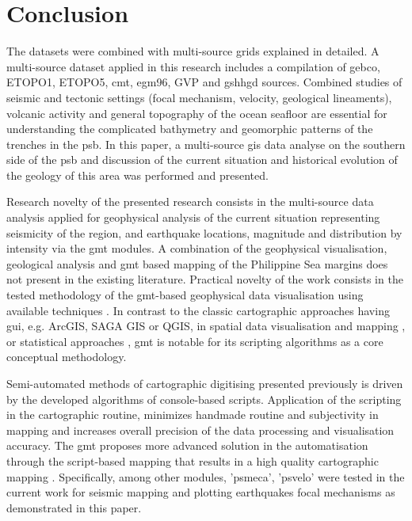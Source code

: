 \documentclass{rrparticle}
\begin{document}
\section{Conclusion}
The datasets were combined with multi-source grids explained in detailed. A multi-source dataset applied in this research includes a compilation of \ac{gebco}, ETOPO1, ETOPO5, \ac{cmt}, \ac{egm96}, GVP and \ac{gshhgd} sources. Combined studies of seismic and tectonic settings (focal mechanism, velocity, geological lineaments), volcanic activity and general topography of the ocean seafloor are essential for understanding the complicated bathymetry and geomorphic patterns of the trenches in the \ac{psb}. In this paper, a multi-source \ac{gis} data analyse on the southern side of the \ac{psb} and discussion of the current situation and historical evolution of the geology of this area was performed and presented. 

Research novelty of the presented research consists in the multi-source data analysis applied for geophysical analysis of the current situation representing seismicity of the region, and earthquake locations, magnitude and distribution by intensity via the \ac{gmt} modules. A combination of the geophysical visualisation, geological analysis and \ac{gmt} based mapping of the Philippine Sea margins does not present in the existing literature. Practical novelty of the work consists in the tested methodology of the \ac{gmt}-based geophysical data visualisation using available techniques \cite{Lemenkova2022a,Lemenkova2022b}. In contrast to the classic cartographic approaches having \ac{gui}, e.g. ArcGIS, SAGA GIS or QGIS, in spatial data visualisation and mapping \cite{Lemenkova2021d,Lemenkova2020e,Klauco2013,Klauco2017,Lemenkova2021b}, or statistical approaches \cite{Lemenkova2019e,Lemenkova2019f}, \ac{gmt} is notable for its scripting algorithms as a core conceptual methodology. 
	
Semi-automated methods of cartographic digitising presented previously \cite{Lemenkova2021b} is driven by the developed algorithms of console-based scripts. Application of the scripting in the cartographic routine, minimizes handmade routine and subjectivity in mapping and increases overall precision of the data processing and visualisation accuracy. The \ac{gmt} proposes more advanced solution in the automatisation through the script-based mapping that results in a high quality cartographic mapping \cite{Lemenkova2020a,Lemenkova2020b,Lemenkova2020f,Lemenkova2020h,Lemenkova2020d}. Specifically, among other modules, 'psmeca', 'psvelo' were tested in the current work for seismic mapping and plotting earthquakes focal mechanisms as demonstrated in this paper. 
\end{document}
